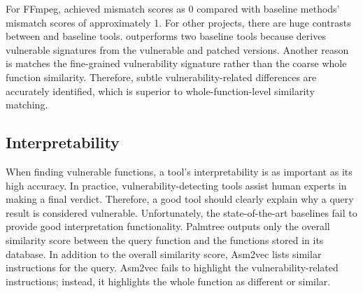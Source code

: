 For FFmpeg, \name achieved mismatch scores as 0 compared with baseline methods' mismatch scores of approximately 1.
For other projects, there are huge contrasts between \name and baseline tools.
\name outperforms two baseline tools because  \name derives vulnerable signatures from the vulnerable and patched versions. 
Another reason is \name matches the fine-grained vulnerability signature rather than the coarse whole function similarity. 
Therefore, subtle vulnerability-related differences are accurately identified, which is superior to whole-function-level similarity matching.


\subsection{Interpretability}




When finding vulnerable functions, a tool's interpretability is as important as its high accuracy. 
In practice, vulnerability-detecting tools assist human experts in making a final verdict. 
Therefore, a good tool should clearly explain why a query result is considered vulnerable.  
Unfortunately, the state-of-the-art baselines fail to provide good interpretation functionality. 
Palmtree outputs only the overall similarity score between the query function and the functions stored in its database. 
In addition to the overall similarity score, Asm2vec lists similar instructions for the query. 
Asm2vec fails to highlight the vulnerability-related instructions; instead, it highlights the whole function as different or similar.



